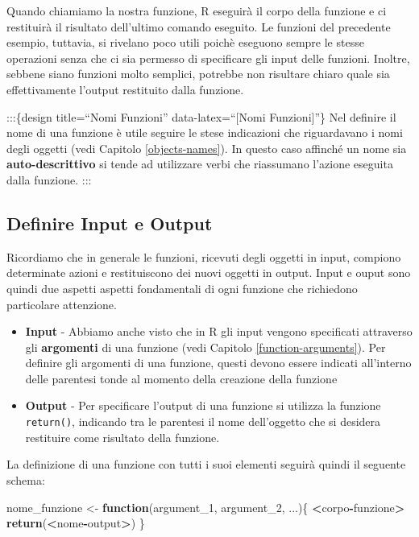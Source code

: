 \documentclass[
]{book}
\newenvironment{Shaded}{\begin{snugshade}}{\end{snugshade}}
\newcommand{\ControlFlowTok}[1]{\textcolor[rgb]{0.13,0.29,0.53}{\textbf{#1}}}
\newcommand{\DecValTok}[1]{\textcolor[rgb]{0.00,0.00,0.81}{#1}}
\newcommand{\KeywordTok}[1]{\textcolor[rgb]{0.13,0.29,0.53}{\textbf{#1}}}
\newcommand{\NormalTok}[1]{#1}
\newcommand{\OperatorTok}[1]{\textcolor[rgb]{0.81,0.36,0.00}{\textbf{#1}}}
\newcommand{\StringTok}[1]{\textcolor[rgb]{0.31,0.60,0.02}{#1}}
\providecommand{\tightlist}{%
  \setlength{\itemsep}{0pt}\setlength{\parskip}{0pt}}
\begin{document}
Quando chiamiamo la nostra funzione, R eseguirà il corpo della funzione e ci restituirà il risultato dell'ultimo comando eseguito. Le funzioni del precedente esempio, tuttavia, si rivelano poco utili poichè eseguono sempre le stesse operazioni senza che ci sia permesso di specificare gli input delle funzioni. Inoltre, sebbene siano funzioni molto semplici, potrebbe non risultare chiaro quale sia effettivamente l'output restituito dalla funzione.

:::\{design title=``Nomi Funzioni'' data-latex=``{[}Nomi Funzioni{]}''\}
Nel definire il nome di una funzione è utile seguire le stese indicazioni che riguardavano i nomi degli oggetti (vedi Capitolo \ref{objects-names}). In questo caso affinché un nome sia \textbf{auto-descrittivo} si tende ad utilizzare verbi che riassumano l'azione eseguita dalla funzione.
:::

\hypertarget{definire-input-e-output}{%
\subsection{Definire Input e Output}\label{definire-input-e-output}}

Ricordiamo che in generale le funzioni, ricevuti degli oggetti in input, compiono determinate azioni e restituiscono dei nuovi oggetti in output. Input e ouput sono quindi due aspetti aspetti fondamentali di ogni funzione che richiedono particolare attenzione.

\begin{itemize}
\tightlist
\item
  \textbf{Input} - Abbiamo anche visto che in R gli input vengono specificati attraverso gli \textbf{argomenti} di una funzione (vedi Capitolo \ref{function-arguments}). Per definire gli argomenti di una funzione, questi devono essere indicati all'interno delle parentesi tonde al momento della creazione della funzione
\item
  \textbf{Output} - Per specificare l'output di una funzione si utilizza la funzione \texttt{return()}, indicando tra le parentesi il nome dell'oggetto che si desidera restituire come risultato della funzione.
\end{itemize}

La definizione di una funzione con tutti i suoi elementi seguirà quindi il seguente schema:

\begin{Shaded}
\begin{Highlighting}[]
\NormalTok{nome_funzione <-}\StringTok{ }\ControlFlowTok{function}\NormalTok{(argument_}\DecValTok{1}\NormalTok{, argument_}\DecValTok{2}\NormalTok{, ...)\{}
  \OperatorTok{<}\NormalTok{corpo}\OperatorTok{-}\NormalTok{funzione}\OperatorTok{>}
\StringTok{  }
\StringTok{  }\KeywordTok{return}\NormalTok{(}\OperatorTok{<}\NormalTok{nome}\OperatorTok{-}\NormalTok{output}\OperatorTok{>}\NormalTok{)}
\NormalTok{\}}
\end{Highlighting}
\end{Shaded}
\end{document}
